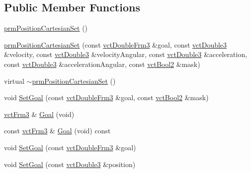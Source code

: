 \subsection*{Public Member Functions}
\begin{DoxyCompactItemize}
\item 
\hyperlink{classprm_position_cartesian_set_ab399e9353016dd8acadbcc0329c6fc4b}{prm\+Position\+Cartesian\+Set} ()
\item 
\hyperlink{classprm_position_cartesian_set_a62d1b0125aa0628bb5d6735d589d2e83}{prm\+Position\+Cartesian\+Set} (const \hyperlink{vct_transformation_types_8h_acc33ebdc1b58783aa59508c7b5200b56}{vct\+Double\+Frm3} \&goal, const \hyperlink{vct_fixed_size_vector_types_8h_a4a89122c9d7f72c3f31fe8126e17c3af}{vct\+Double3} \&velocity, const \hyperlink{vct_fixed_size_vector_types_8h_a4a89122c9d7f72c3f31fe8126e17c3af}{vct\+Double3} \&velocity\+Angular, const \hyperlink{vct_fixed_size_vector_types_8h_a4a89122c9d7f72c3f31fe8126e17c3af}{vct\+Double3} \&acceleration, const \hyperlink{vct_fixed_size_vector_types_8h_a4a89122c9d7f72c3f31fe8126e17c3af}{vct\+Double3} \&acceleration\+Angular, const \hyperlink{vct_fixed_size_vector_types_8h_ab49415a9643a1ee037f2a036058caeaa}{vct\+Bool2} \&mask)
\item 
virtual \hyperlink{classprm_position_cartesian_set_aa034f08ad07ae2777f660472f03ce7ca}{$\sim$prm\+Position\+Cartesian\+Set} ()
\item 
void \hyperlink{classprm_position_cartesian_set_a2ae3d0a9167cef13a829338802fb6329}{Set\+Goal} (const \hyperlink{vct_transformation_types_8h_acc33ebdc1b58783aa59508c7b5200b56}{vct\+Double\+Frm3} \&goal, const \hyperlink{vct_fixed_size_vector_types_8h_ab49415a9643a1ee037f2a036058caeaa}{vct\+Bool2} \&mask)
\item 
\hyperlink{vct_transformation_types_8h_a81feda0a02c2d1bc26e5553f409fed20}{vct\+Frm3} \& \hyperlink{classprm_position_cartesian_set_ac4ecda1c96f8d40c18e998cd22488eb8}{Goal} (void)
\item 
const \hyperlink{vct_transformation_types_8h_a81feda0a02c2d1bc26e5553f409fed20}{vct\+Frm3} \& \hyperlink{classprm_position_cartesian_set_a4a76e968da8a130f42c41a06b2eea35b}{Goal} (void) const 
\item 
void \hyperlink{classprm_position_cartesian_set_ab6b21f2c95db085559eb790314f0b5c5}{Set\+Goal} (const \hyperlink{vct_transformation_types_8h_acc33ebdc1b58783aa59508c7b5200b56}{vct\+Double\+Frm3} \&goal)
\item 
void \hyperlink{classprm_position_cartesian_set_ab324983ec5668c66d8ff2fb96687d221}{Set\+Goal} (const \hyperlink{vct_fixed_size_vector_types_8h_a4a89122c9d7f72c3f31fe8126e17c3af}{vct\+Double3} \&position)

\end{DoxyCompactItemize}

